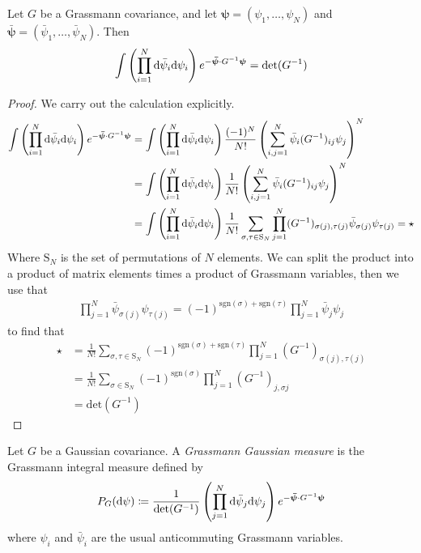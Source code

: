 \begin{lemma}
	Let $G$ be a Grassmann covariance, and let $\boldsymbol{\psi} = (\psi_1, \ldots, \psi_N)$
	and $\boldsymbol{\bar\psi} = (\bar\psi_1, \ldots, \bar\psi_N)$. Then
	\begin{align*}
		\int\left( \prod_{i=1}^N \mathrm{d}\bar\psi_i \mathrm{d}\psi_i \right)
		e^{-\boldsymbol{\bar\psi} \cdot G^{-1} \boldsymbol{\psi}} = \mathrm{det}(G^{-1})
	\end{align*}
\end{lemma}
\begin{proof}
	We carry out the calculation explicitly.
	\begin{align*}
		\int\left( \prod_{i=1}^N \mathrm{d}\bar\psi_i \mathrm{d}\psi_i \right)
		e^{-\boldsymbol{\bar\psi} \cdot G^{-1} \boldsymbol{\psi}}
		&= \int\left( \prod_{i=1}^N \mathrm{d}\bar\psi_i \mathrm{d}\psi_i \right)
		\frac{(-1)^N}{N!}\left( \sum_{i,j=1}^N \bar\psi_i (G^{-1})_{ij} \psi_j \right)^N \\
		&= \int\left( \prod_{i=1}^N \mathrm{d}\bar\psi_i \mathrm{d}\psi_i \right)
		\frac{1}{N!}\left( \sum_{i,j=1}^N \bar\psi_i (G^{-1})_{ij} \psi_j \right)^N \\
		&= \int\left( \prod_{i=1}^N \mathrm{d}\bar\psi_i \mathrm{d}\psi_i \right)
		\frac{1}{N!} \sum_{\sigma,\tau \in \mathrm{S}_N} \prod_{j=1}^N (G^{-1})_{\sigma(j),\tau(j)} \bar\psi_{\sigma(j)} \psi_{\tau(j)}
		= \star
	\end{align*}
	Where $\mathrm{S}_N$ is the set of permutations of $N$ elements. We can split the product
	into a product of matrix elements times a product of Grassmann variables, then we use that
	\begin{align*}
		\prod_{j=1}^N \bar\psi_{\sigma(j)}\psi_{\tau(j)} = (-1)^{\mathrm{sgn}(\sigma) + \mathrm{sgn}(\tau)} \prod_{j=1}^N \bar\psi_j \psi_j
	\end{align*}
	to find that
	\begin{align*}
		\star &= \frac{1}{N!} \sum_{\sigma,\tau \in \mathrm{S}_N} (-1)^{\mathrm{sgn}(\sigma) + \mathrm{sgn}(\tau)}
		\prod_{j=1}^N (G^{-1})_{\sigma(j),\tau(j)} \\
		&= \frac{1}{N!} \sum_{\sigma \in \mathrm{S}_N} (-1)^{\mathrm{sgn}(\sigma)}
		\prod_{j=1}^N (G^{-1})_{j,\sigma{j}} \\
		&= \mathrm{det}(G^{-1})
	\end{align*}
\end{proof}

\begin{definition}
	Let $G$ be a Gaussian covariance. A \textit{Grassmann Gaussian measure} is the Grassmann
	integral measure defined by
	\begin{align*}
		P_G(\mathrm{d}\psi) \coloneq \frac{1}{\mathrm{det}(G^{-1})}
		\left( \prod_{j=1}^N \mathrm{d}\bar\psi_j \mathrm{d}\psi_j \right)
		e^{-\boldsymbol{\bar\psi} \cdot G^{-1} \boldsymbol{\psi}}
	\end{align*}
	where $\psi_i$ and $\bar\psi_i$ are the usual anticommuting Grassmann variables.
\end{definition}

